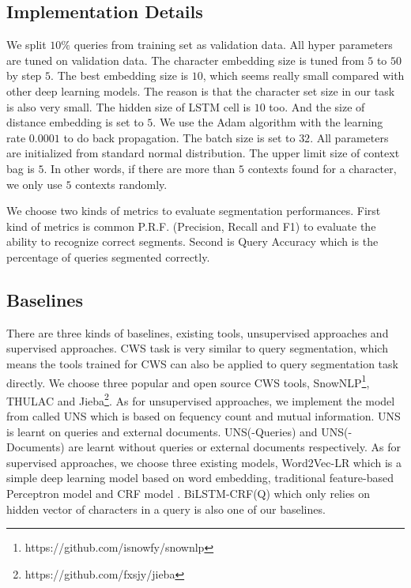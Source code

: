 \subsection{Implementation Details}

We split $10\%$ queries from training set as validation data. All hyper parameters are tuned on validation data. The character embedding size is tuned from $5$ to $50$ by step $5$. The best embedding size is $10$, which seems really small compared with other deep learning models. The reason is that the character set size in our task is also very small. The hidden size of LSTM cell is $10$ too. And the size of distance embedding is set to $5$. We use the Adam algorithm with the learning rate $0.0001$ to do back propagation. The batch size is set to $32$. All parameters are initialized from standard normal distribution. The upper limit size of context bag is $5$. In other words, if there are more than $5$ contexts found for a character, we only use $5$ contexts randomly.

We choose two kinds of metrics to evaluate segmentation performances. First kind of metrics is common P.R.F. (Precision, Recall and F1) to evaluate the ability to recognize correct segments. Second is Query Accuracy which is the percentage of queries segmented correctly.


\subsection{Baselines}

There are three kinds of baselines, existing tools, unsupervised approaches and supervised approaches. CWS task is very similar to query segmentation, which means the tools trained for CWS can also be applied to query segmentation task directly. We choose three popular and open source CWS tools, SnowNLP\footnote{https://github.com/isnowfy/snownlp}, THULAC \cite{sun2016thulac} and Jieba\footnote{https://github.com/fxsjy/jieba}. As for unsupervised approaches, we implement the model from \cite{risvik_query_2003} called UNS which is based on fequency count and mutual information. UNS is learnt on queries and external documents. UNS(-Queries) and UNS(-Documents) are learnt without queries or external documents respectively. As for supervised approaches, we choose three existing models, Word2Vec-LR \cite{kale_towards_2017} which is a simple deep learning model based on word embedding, traditional feature-based Perceptron model \cite{du_perceptron-based_2014} and CRF model \cite{yu_query_2009}. BiLSTM-CRF(Q) which only relies on hidden vector of characters in a query is also one of our baselines.

